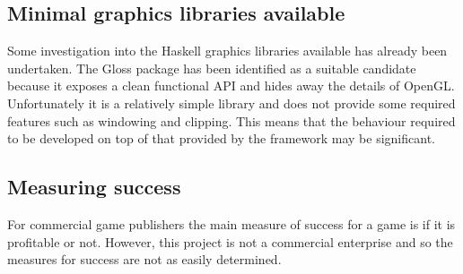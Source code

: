 \subsection{Minimal graphics libraries available}

Some investigation into the Haskell graphics libraries available has already been undertaken.
The Gloss package has been identified as a suitable candidate because it exposes a clean
functional API and hides away the details of OpenGL. Unfortunately it is a relatively simple
library and does not provide some required features such as windowing and clipping.
This means that the behaviour required to be developed on top of that provided by the framework may be significant.

\subsection{Measuring success}

For commercial game publishers the main measure of success for a game is if it
is profitable or not. However, this project is not a commercial enterprise and
so the measures for success are not as easily determined.
